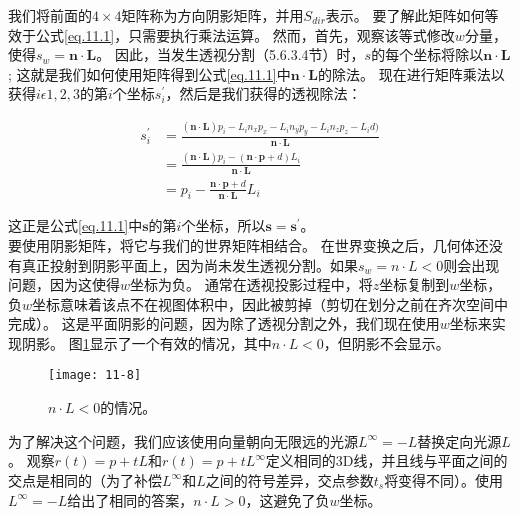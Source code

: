 \begin{flushleft}
我们将前面的$4\times 4$矩阵称为方向阴影矩阵，并用$S_{dir}$表示。 要了解此矩阵如何等效于公式\ref{eq.11.1}，只需要执行乘法运算。 然而，首先，观察该等式修改$w$分量，使得$s_{w}=\boldsymbol{n}\cdot \boldsymbol{L}$。 因此，当发生透视分割（5.6.3.4节）时，$s$的每个坐标将除以$\boldsymbol{n}\cdot \boldsymbol{L}$; 这就是我们如何使用矩阵得到公式\ref{eq.11.1}中$\boldsymbol{n}\cdot \boldsymbol{L}$的除法。 现在进行矩阵乘法以获得$i\epsilon {1,2,3}$的第$i$个坐标$s^{'}_{i}$，然后是我们获得的透视除法：\\
\end{flushleft}

\begin{align*}
s^{'}_{i}&=\frac{(\boldsymbol{n}\cdot \boldsymbol{L})p_{i}-L_{i}n_{x}p_{x}-L_{i}n_{y}p_{y}-L_{i}n_{z}p_{z}-L_{i}d)}{\boldsymbol{n}\cdot \boldsymbol{L}}\\
&=\frac{(\boldsymbol{n}\cdot \boldsymbol{L})p_{i}-(\boldsymbol{n}\cdot \boldsymbol{p}+d)L_{i}}{\boldsymbol{n}\cdot \boldsymbol{L}}\\
&=p_{i}-\frac{\boldsymbol{n}\cdot \boldsymbol{p}+d}{\boldsymbol{n}\cdot \boldsymbol{L}}L_{i}
\end{align*}

\begin{flushleft}
这正是公式\ref{eq.11.1}中$\boldsymbol{s}$的第$i$个坐标，所以$\boldsymbol{s}=\boldsymbol{s^{'}}$。\\

要使用阴影矩阵，将它与我们的世界矩阵相结合。 在世界变换之后，几何体还没有真正投射到阴影平面上，因为尚未发生透视分割。如果$s_{w}=n\cdot L<0$则会出现问题，因为这使得$w$坐标为负。 通常在透视投影过程中，将$z$坐标复制到$w$坐标，负$w$坐标意味着该点不在视图体积中，因此被剪掉（剪切在划分之前在齐次空间中完成）。 这是平面阴影的问题，因为除了透视分割之外，我们现在使用$w$坐标来实现阴影。 图\ref{fig:11-8}显示了一个有效的情况，其中$n\cdot L<0$，但阴影不会显示。\\
\end{flushleft}

\begin{figure}[h]
    \texttt{[image: 11-8]}
    \centering
    \caption{$n\cdot L<0$的情况。}
    \label{fig:11-8}
\end{figure}

\begin{flushleft}
为了解决这个问题，我们应该使用向量朝向无限远的光源$L^{\infty}=-L$替换定向光源$L$。 观察$r(t)=p+tL$和$r(t)=p+tL^{\infty}$定义相同的3D线，并且线与平面之间的交点是相同的（为了补偿$L^{\infty}$和$L$之间的符号差异，交点参数$t_{s}$将变得不同）。使用$L^{\infty}=-L$给出了相同的答案，$n\cdot L>0$，这避免了负$w$坐标。\\
\end{flushleft}

